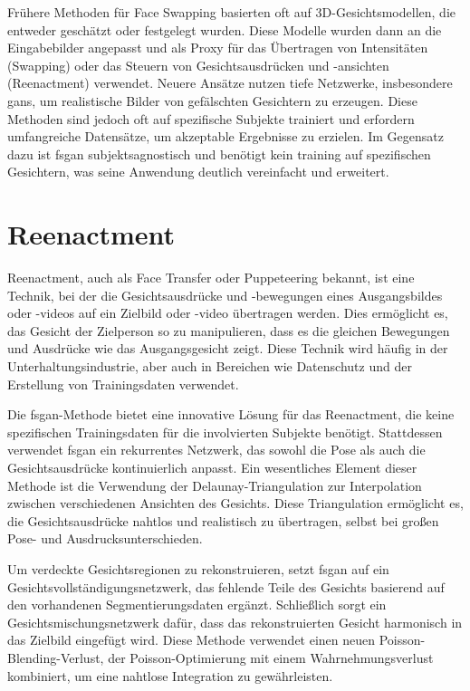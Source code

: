 Frühere Methoden für Face Swapping basierten oft auf 3D-Gesichtsmodellen, die entweder geschätzt oder festgelegt wurden.
Diese Modelle wurden dann an die Eingabebilder angepasst und als Proxy für das Übertragen von Intensitäten (Swapping) oder das Steuern von Gesichtsausdrücken und -ansichten (Reenactment) verwendet.
Neuere Ansätze nutzen tiefe Netzwerke, insbesondere \glspl{gan}, um realistische Bilder von gefälschten Gesichtern zu erzeugen.
Diese Methoden sind jedoch oft auf spezifische Subjekte trainiert und erfordern umfangreiche Datensätze, um akzeptable Ergebnisse zu erzielen.
Im Gegensatz dazu ist \gls{fsgan} subjektsagnostisch und benötigt kein training auf spezifischen Gesichtern, was seine Anwendung deutlich vereinfacht und erweitert.

\section{Reenactment}\label{sec:reenactment}
Reenactment, auch als Face Transfer oder Puppeteering bekannt, ist eine Technik, bei der die Gesichtsausdrücke und -bewegungen eines Ausgangsbildes oder -videos auf ein Zielbild oder -video übertragen werden.
Dies ermöglicht es, das Gesicht der Zielperson so zu manipulieren, dass es die gleichen Bewegungen und Ausdrücke wie das Ausgangsgesicht zeigt.
Diese Technik wird häufig in der Unterhaltungsindustrie, aber auch in Bereichen wie Datenschutz und der Erstellung von Trainingsdaten verwendet.

Die \gls{fsgan}-Methode bietet eine innovative Lösung für das Reenactment, die keine spezifischen Trainingsdaten für die involvierten Subjekte benötigt.
Stattdessen verwendet \gls{fsgan} ein rekurrentes Netzwerk, das sowohl die Pose als auch die Gesichtsausdrücke kontinuierlich anpasst.
Ein wesentliches Element dieser Methode ist die Verwendung der Delaunay-Triangulation zur Interpolation zwischen verschiedenen Ansichten des Gesichts.
Diese Triangulation ermöglicht es, die Gesichtsausdrücke nahtlos und realistisch zu übertragen, selbst bei großen Pose- und Ausdrucksunterschieden.

Um verdeckte Gesichtsregionen zu rekonstruieren, setzt \gls{fsgan} auf ein Gesichtsvollständigungsnetzwerk, das fehlende Teile des Gesichts basierend auf den vorhandenen Segmentierungsdaten ergänzt.
Schließlich sorgt ein Gesichtsmischungsnetzwerk dafür, dass das rekonstruierten Gesicht harmonisch in das Zielbild eingefügt wird.
Diese Methode verwendet einen neuen Poisson-Blending-Verlust, der Poisson-Optimierung mit einem Wahrnehmungsverlust kombiniert, um eine nahtlose Integration zu gewährleisten.

